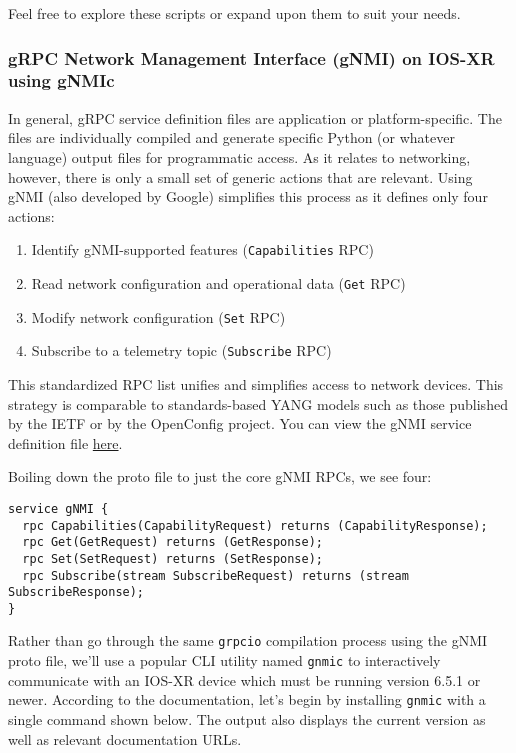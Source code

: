 Feel free to explore these scripts or expand upon them to suit your needs.

\subsubsection{gRPC Network Management Interface (gNMI) on IOS-XR using gNMIc}
In general, gRPC service definition files are application or platform-specific.
The files are individually compiled and generate specific Python (or whatever
language) output files for programmatic access. As it relates to networking,
however, there is only a small set of generic actions that are relevant.
Using gNMI (also developed by Google) simplifies this process as it
defines only four actions:

\begin{enumerate}
  \item Identify gNMI-supported features (\verb|Capabilities| RPC)
  \item Read network configuration and operational data (\verb|Get| RPC)
  \item Modify network configuration (\verb|Set| RPC)
  \item Subscribe to a telemetry topic (\verb|Subscribe| RPC)
\end{enumerate}

This standardized RPC list unifies and simplifies access to network devices.
This strategy is comparable to standards-based YANG models such as those
published by the IETF or by the OpenConfig project. You can view the gNMI
service definition file
\href{https://github.com/openconfig/gnmi/blob/master/proto/gnmi/gnmi.proto}{here}.

Boiling down the proto file to just the core gNMI RPCs, we see four:

\begin{verbatim}
service gNMI {
  rpc Capabilities(CapabilityRequest) returns (CapabilityResponse);
  rpc Get(GetRequest) returns (GetResponse);
  rpc Set(SetRequest) returns (SetResponse);
  rpc Subscribe(stream SubscribeRequest) returns (stream SubscribeResponse);
}
\end{verbatim}

Rather than go through the same \verb|grpcio| compilation process using
the gNMI proto file, we'll use a popular CLI utility named \verb|gnmic|
to interactively communicate with an IOS-XR device which must be running
version 6.5.1 or newer. According to the documentation, let's begin
by installing \verb|gnmic| with a single command shown below. The output
also displays the current version as well as relevant documentation URLs.


